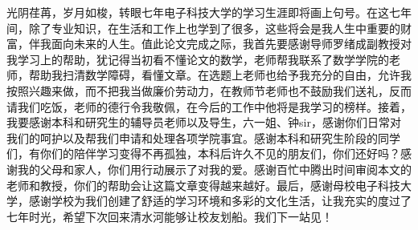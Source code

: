 
\thesisacknowledgement
光阴荏苒，岁月如梭，转眼七年电子科技大学的学习生涯即将画上句号。在这七年间，除了专业知识，在生活和工作上也学到了很多，这些将会是我人生中重要的财富，伴我面向未来的人生。值此论文完成之际，我首先要感谢导师罗绪成副教授对我学习上的帮助，犹记得当初看不懂论文的数学，老师帮我联系了数学学院的老师，帮助我扫清数学障碍，看懂文章。在选题上老师也给予我充分的自由，允许我按照兴趣来做，而不把我当做廉价劳动力，在教师节老师也不鼓励我们送礼，反而请我们吃饭，老师的德行令我敬佩，在今后的工作中他将是我学习的榜样。接着，我要感谢本科和研究生的辅导员老师以及导生，六一姐、钟sir，感谢你们日常对我们的呵护以及帮我们申请和处理各项学院事宜。感谢本科和研究生阶段的同学们，有你们的陪伴学习变得不再孤独，本科后许久不见的朋友们，你们还好吗？感谢我的父母和家人，你们用行动展示了对我的爱。感谢百忙中腾出时间审阅本文的老师和教授，你们的帮助会让这篇文章变得越来越好。最后，感谢母校电子科技大学，感谢学校为我们创建了舒适的学习环境和多彩的文化生活，让我充实的度过了七年时光，希望下次回来清水河能够让校友划船。我们下一站见！
